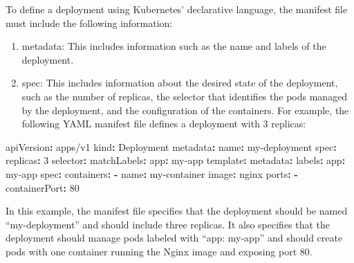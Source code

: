 \documentclass[
  11pt,
]{article}
\newenvironment{Shaded}{}{}
\newcommand{\AttributeTok}[1]{\textcolor[rgb]{0.49,0.56,0.16}{#1}}
\newcommand{\DecValTok}[1]{\textcolor[rgb]{0.25,0.63,0.44}{#1}}
\newcommand{\FunctionTok}[1]{\textcolor[rgb]{0.02,0.16,0.49}{#1}}
\newcommand{\KeywordTok}[1]{\textcolor[rgb]{0.00,0.44,0.13}{\textbf{#1}}}
\begin{document}
To define a deployment using Kubernetes' declarative language, the
manifest file must include the following information:

\begin{enumerate}
\def\labelenumi{\arabic{enumi}.}
\item
  metadata: This includes information such as the name and labels of the
  deployment.
\item
  spec: This includes information about the desired state of the
  deployment, such as the number of replicas, the selector that
  identifies the pods managed by the deployment, and the configuration
  of the containers. For example, the following YAML manifest file
  defines a deployment with 3 replicas:
\end{enumerate}

\begin{Shaded}
\begin{Highlighting}[]
\FunctionTok{apiVersion}\KeywordTok{:}\AttributeTok{ apps/v1}
\FunctionTok{kind}\KeywordTok{:}\AttributeTok{ Deployment}
\FunctionTok{metadata}\KeywordTok{:}
\AttributeTok{  }\FunctionTok{name}\KeywordTok{:}\AttributeTok{ my{-}deployment}
\FunctionTok{spec}\KeywordTok{:}
\AttributeTok{  }\FunctionTok{replicas}\KeywordTok{:}\AttributeTok{ }\DecValTok{3}
\AttributeTok{  }\FunctionTok{selector}\KeywordTok{:}
\AttributeTok{    }\FunctionTok{matchLabels}\KeywordTok{:}
\AttributeTok{      }\FunctionTok{app}\KeywordTok{:}\AttributeTok{ my{-}app}
\AttributeTok{  }\FunctionTok{template}\KeywordTok{:}
\AttributeTok{    }\FunctionTok{metadata}\KeywordTok{:}
\AttributeTok{      }\FunctionTok{labels}\KeywordTok{:}
\AttributeTok{        }\FunctionTok{app}\KeywordTok{:}\AttributeTok{ my{-}app}
\AttributeTok{    }\FunctionTok{spec}\KeywordTok{:}
\AttributeTok{      }\FunctionTok{containers}\KeywordTok{:}
\AttributeTok{      }\KeywordTok{{-}}\AttributeTok{ }\FunctionTok{name}\KeywordTok{:}\AttributeTok{ my{-}container}
\AttributeTok{        }\FunctionTok{image}\KeywordTok{:}\AttributeTok{ nginx}
\AttributeTok{        }\FunctionTok{ports}\KeywordTok{:}
\AttributeTok{        }\KeywordTok{{-}}\AttributeTok{ }\FunctionTok{containerPort}\KeywordTok{:}\AttributeTok{ }\DecValTok{80}
\end{Highlighting}
\end{Shaded}

In this example, the manifest file specifies that the deployment should
be named ``my-deployment'' and should include three replicas. It also
specifies that the deployment should manage pods labeled with ``app:
my-app'' and should create pods with one container running the Nginx
image and exposing port 80.
\end{document}
